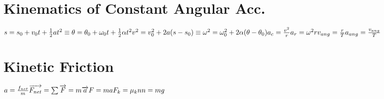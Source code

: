 \documentclass[14pt]{article}
\begin{document}
    \section*{Kinematics of Constant Angular Acc.}
    \begin{fleqn}
        $
        s=s_0 + v_0t + \frac{1}{2}at^2 \equiv \theta = \theta_0 + \omega_0 t + \frac{1}{2}\alpha t^2 \newline
        v^2 = v_0^2+2a(s-s_0)  \equiv \omega^2 = \omega_0 ^2 + 2 \alpha (\theta - \theta_0)\newline
        a_c = \frac{v^2}{r} \newline
        a_r = \omega^2r \newline
        v_{ang} = \frac{r}{T} \newline
        a_{ang} = \frac{v_{ang}}{T} \newline
        $
    \end{fleqn}
    \section*{Kinetic Friction}
    \begin{fleqn}
        $
        a=\frac{f_{net}}{m} \newline
        \overrightarrow{F_{net}} = \sum \overrightarrow{F} = m \overrightarrow{a} \newline
        F=ma \newline F_k = \mu_{k}n \newline n=mg
        $
    \end{fleqn}
\end{document}
